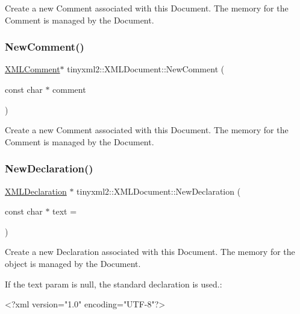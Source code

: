 Create a new Comment associated with this Document. The memory for the Comment is managed by the Document. \mbox{\label{classtinyxml2_1_1XMLDocument_ade4874bcb439954972ef2b3723ff3259}} 
\subsubsection{\texorpdfstring{New\+Comment()}{NewComment()}\hspace{0.1cm}{\footnotesize\ttfamily [2/2]}}
{\footnotesize\ttfamily \hyperlink{classtinyxml2_1_1XMLComment}{X\+M\+L\+Comment}$\ast$ tinyxml2\+::\+X\+M\+L\+Document\+::\+New\+Comment (\begin{DoxyParamCaption}\item[{const char $\ast$}]{comment }\end{DoxyParamCaption})}

Create a new Comment associated with this Document. The memory for the Comment is managed by the Document. \mbox{\label{classtinyxml2_1_1XMLDocument_ae519030c0262fa2daff8993681990e16}} 
\subsubsection{\texorpdfstring{New\+Declaration()}{NewDeclaration()}\hspace{0.1cm}{\footnotesize\ttfamily [1/2]}}
{\footnotesize\ttfamily \hyperlink{classtinyxml2_1_1XMLDeclaration}{X\+M\+L\+Declaration} $\ast$ tinyxml2\+::\+X\+M\+L\+Document\+::\+New\+Declaration (\begin{DoxyParamCaption}\item[{const char $\ast$}]{text = {} }\end{DoxyParamCaption})}

Create a new Declaration associated with this Document. The memory for the object is managed by the Document.

If the \textquotesingle{}text\textquotesingle{} param is null, the standard declaration is used.\+: \begin{DoxyVerb}    <?xml version="1.0" encoding="UTF-8"?>
\end{DoxyVerb}
 \mbox{\label{classtinyxml2_1_1XMLDocument_aee2eb3435923f5494dcc70ac225b60a2}} 
